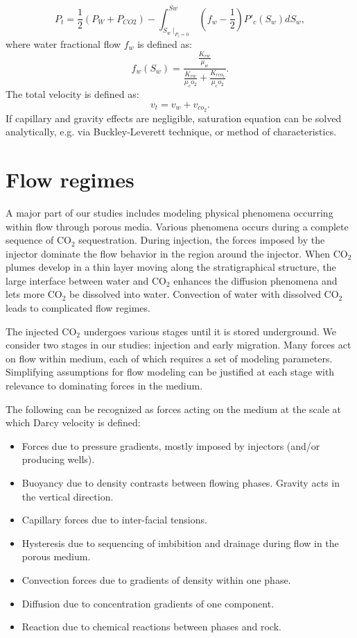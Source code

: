\begin{equation}
 P_t=\frac{1}{2} (P_W+P_{CO2})-\int^{Sw}_{S_w
\mid_{P_c=0}}(f_w-\frac{1}{2}){P'}_c(S_w)dS_w,
 \label{eq:GP}
\end{equation} where water fractional flow $f_w$ is defined as:
\begin{equation}
 f_w(S_w)=\frac{\frac{K_{rw}}{\mu_w}}{\frac{K_{rw}}{\mu_co_2}+\frac{K_{rco_2}}{
\mu_co_2}}.
 \label{eq:fw}
\end{equation} The total velocity is defined as:
\begin{equation}
 v_t=v_w+v_{co_2}.
 \label{eq:VT}
\end{equation}If capillary and gravity effects are negligible, saturation
equation can be solved analytically, e.g. via Buckley-Leverett technique, or
method of characteristics.


\section{Flow regimes}
\label{sec:FlowRegimes}

A major part of our studies includes modeling physical phenomena occurring
within
flow through porous media. Various phenomena occurs during a complete sequence
of $\mbox{CO}_2$ sequestration. During injection, the forces imposed by the injector
dominate the flow behavior in the region around the injector. When $\mbox{CO}_2$
plumes develop in a thin layer moving along the stratigraphical structure, the large interface between water and $\mbox{CO}_2$ enhances the diffusion phenomena
and lets more $\mbox{CO}_2$ be dissolved into water. Convection of water with
dissolved $\mbox{CO}_2$ leads to complicated flow regimes.

The injected $\mbox{CO}_2$ undergoes various stages until it is stored
underground. We consider two stages in our studies: injection and early
migration. Many forces act on flow within medium, each
of which requires a set of modeling parameters. Simplifying assumptions for flow
modeling can be justified at each stage with relevance to dominating forces in
the medium.

The following can be recognized as forces acting on the medium at the scale at
which Darcy velocity is defined:

\begin{itemize}
\item Forces due to pressure gradients, mostly imposed by injectors (and/or
producing wells).
\item Buoyancy due to density contrasts between flowing phases. Gravity acts in the vertical direction.
\item Capillary forces due to inter-facial tensions.
\item Hysteresis due to sequencing of imbibition and drainage during flow in
the porous medium.
\item Convection forces due to gradients of density within one phase.
\item Diffusion due to concentration gradients of one component.
\item Reaction due to chemical reactions between phases and rock.
\end{itemize}

